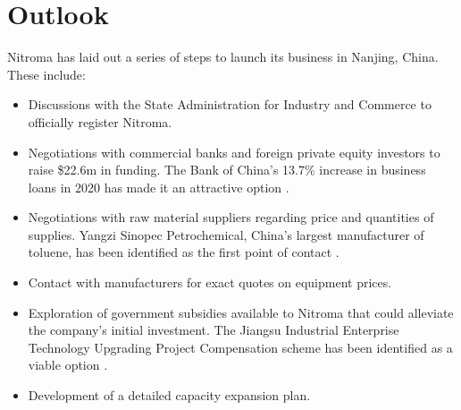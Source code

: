 \section{Outlook}
Nitroma has laid out a series of steps to launch its business in Nanjing, China. These include:
\begin{itemize}
    \item Discussions with the State Administration for Industry and Commerce to officially register Nitroma.
    \item Negotiations with commercial banks and foreign private equity investors to raise \$22.6m in funding. The Bank of China’s 13.7\% increase in business loans in 2020 has made it an attractive option \cite{kimathi_china_2020}.
    \item Negotiations with raw material suppliers regarding price and quantities of supplies. Yangzi Sinopec Petrochemical, China’s largest manufacturer of toluene, has been identified as the first point of contact \cite{sinopec_group_sinopec_2014}.
    \item Contact with manufacturers for exact quotes on equipment prices.
    \item Exploration of government subsidies available to Nitroma that could alleviate the company’s initial investment. The Jiangsu Industrial Enterprise Technology Upgrading Project Compensation scheme has been identified as a viable option \cite{chinainn}.
    \item Development of a detailed capacity expansion plan.
\end{itemize}



